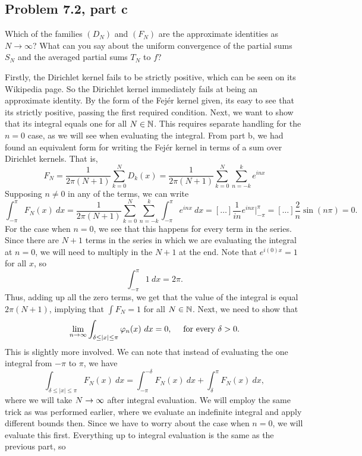 \newpage
\subsection{Problem 7.2, part c}
Which of the families $(D_N)$ and $(F_N)$ are the approximate identities as $N\rightarrow \infty$? What can you say about the uniform convergence of the partial sums $S_N$ and the averaged partial sums $T_N$ to $f$?
\partbreak
\begin{solution}

    Firstly, the Dirichlet kernel fails to be strictly positive, which can be seen on its Wikipedia page. So the Dirichlet kernel immediately fails at being an approximate identity. By the form of the Fej\'er kernel given, its easy to see that its strictly positive, passing the first required condition. Next, we want to show that its integral equals one for all $N \in \mathbb{N}$. This requires separate handling for the $n = 0$ case, as we will see when evaluating the integral. From part b, we had found an equivalent form for writing the Fej\'er kernel in terms of a sum over Dirichlet kernels. That is,
    \[F_N = \frac{1}{2\pi (N+1)}\sum_{k = 0}^N D_k(x) = \frac{1}{2\pi(N+1)} \sum_{k = 0}^N\sum_{n = -k}^k e^{inx}\]
    Supposing $n \neq 0$ in any of the terms, we can write
    \[\int_{-\pi}^\pi F_N(x) \ dx  = \frac{1}{2\pi(N+1)} \sum_{k = 0}^N\sum_{n = -k}^k \int_{-\pi}^\pi e^{inx} \ dx = \left[\dots\right] \frac{1}{in}e^{inx}\Big|_{-\pi}^\pi = \left[\dots\right] \frac{2}{n}\sin (n\pi) = 0.  \]
    For the case when $n = 0$, we see that this happens for every term in the series. Since there are $N+1$ terms in the series in which we are evaluating the integral at $n = 0$, we will need to multiply in the $N+1$ at the end. Note that $e^{i(0)x} = 1$ for all $x$, so 
    \[\int_{-\pi}^\pi 1 \ dx = 2\pi.\]
    Thus, adding up all the zero terms, we get that the value of the integral is equal $2\pi(N+1)$, implying that $\int F_N = 1$ for all $N \in \mathbb{N}$. Next, we need to show that 
    \[\lim_{n \rightarrow \infty} \int_{\delta \leq |x| \leq \pi}\varphi_n(x) \ dx = 0, \quad \text{ for every } \delta > 0.\]
    This is slightly more involved. We can note that instead of evaluating the one integral from $-\pi$ to $\pi$, we have 
    \[\int_{\delta \leq |x| \leq \pi} F_N(x) \ dx = \int_{-\pi}^{-\delta} F_N(x) \ dx + \int_{\delta}^{\pi} F_N(x) \ dx,\]
    where we will take $N \rightarrow \infty$ after integral evaluation. We will employ the same trick as was performed earlier, where we evaluate an indefinite integral and apply different bounds then. Since we have to worry about the case when $n = 0$, we will evaluate this first. Everything up to integral evaluation is the same as the previous part, so

\end{solution}
